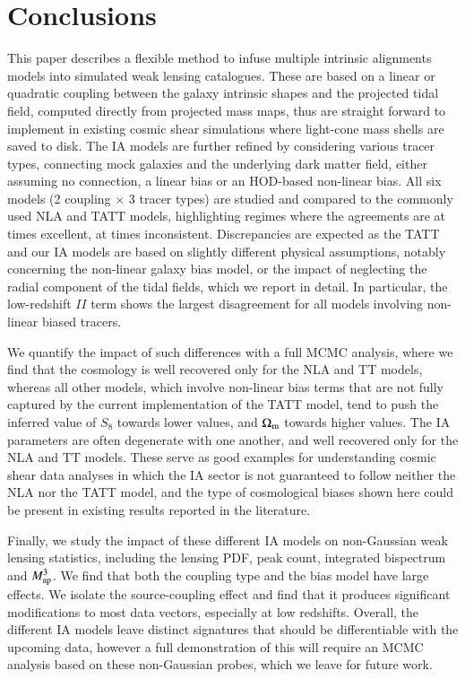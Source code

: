 \section{Conclusions}
\label{sec:conclusion}

This paper describes a flexible method to infuse multiple intrinsic alignments models into simulated weak lensing  catalogues. These are based on a linear or quadratic coupling between the galaxy intrinsic shapes and the projected tidal field, computed directly from projected mass maps, thus are straight forward to implement in existing cosmic shear simulations where light-cone mass shells are saved to disk. The IA models are further refined by considering various tracer types, connecting mock galaxies and the underlying dark matter field,  either assuming no connection, a linear bias or an HOD-based non-linear bias. All six models (2 coupling $\times$ 3 tracer types) are studied and compared to the commonly used NLA and TATT models, highlighting regimes where the agreements are at times excellent, at times inconsistent. Discrepancies are expected as the TATT and our IA models are  based on slightly different physical assumptions, notably concerning the non-linear galaxy bias model, or the impact of neglecting the radial component of the tidal fields, which we report in detail. In particular, the low-redshift $II$ term shows the largest disagreement for all models involving non-linear biased tracers.

We quantify the impact of such differences with a full MCMC analysis, where we find that the cosmology is well recovered only for the NLA and TT models, whereas all other models, which involve non-linear bias terms that are not fully captured by the current implementation of the TATT model, tend to push the inferred value of $S_8$ towards lower values, and $\Omega_{\rm m}$ towards higher values. The IA parameters are often degenerate with one another, and well recovered only for the NLA and TT models. These serve as good examples for understanding cosmic shear data analyses in which the IA sector is not guaranteed to follow neither the NLA nor the TATT model, and the type of cosmological biases shown here could be present in existing results reported in the literature.


Finally, we study the impact of these different IA models on non-Gaussian weak lensing statistics, including the lensing PDF, peak count, integrated bispectrum and $M_{\rm ap}^3$. We find that both the coupling type and the bias model have large effects. We isolate the source-coupling effect and find that it produces significant modifications to most data vectors, especially at low redshifts. Overall, the different IA models leave distinct signatures that should be differentiable with the upcoming data, however a full demonstration of this will require  an MCMC analysis based on these non-Gaussian probes, which we leave for future work.

